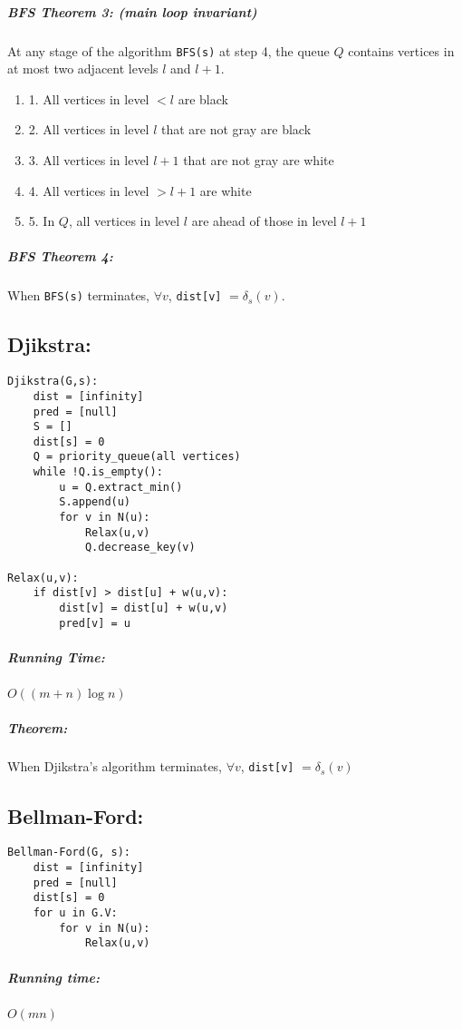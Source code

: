 \documentclass{article}
\newcommand{\code}[1]{\texttt{#1}}
\begin{document}
\subparagraph{BFS Theorem 3: (main loop invariant)} At any stage of the algorithm \code{BFS(s)} at step 4, the queue \(Q\) contains vertices in at most two adjacent levels \(l\) and \(l+1\). \begin{enumerate}
    \item[] 1. All vertices in level \(< l\) are black
    \item[] 2. All vertices in level \(l\) that are not gray are black
    \item[] 3. All vertices in level \(l+1\) that are not gray are white
    \item[] 4. All vertices in level \(> l+1\) are white
    \item[] 5. In \(Q\), all vertices in level \(l\) are ahead of those in level \(l+1\)
\end{enumerate}

\subparagraph{BFS Theorem 4:} When \code{BFS(s)} terminates, \(\forall v\), \code{dist[v]} \(= \delta_s(v)\).

\subsection{Djikstra:}
\begin{lstlisting}
Djikstra(G,s):
    dist = [infinity]
    pred = [null]
    S = []
    dist[s] = 0
    Q = priority_queue(all vertices)
    while !Q.is_empty():
        u = Q.extract_min()
        S.append(u)
        for v in N(u):
            Relax(u,v)
            Q.decrease_key(v)
        
Relax(u,v):
    if dist[v] > dist[u] + w(u,v):
        dist[v] = dist[u] + w(u,v)
        pred[v] = u
\end{lstlisting}

\subparagraph{Running Time:} \(O((m + n) \log n)\)

\subparagraph{Theorem:} When Djikstra's algorithm terminates, \(\forall v\), \code{dist[v]} \(= \delta_s(v)\)

\subsection{Bellman-Ford:}

\begin{lstlisting}
Bellman-Ford(G, s):
    dist = [infinity]
    pred = [null]
    dist[s] = 0
    for u in G.V:
        for v in N(u):
            Relax(u,v)
\end{lstlisting}

\subparagraph{Running time:} \(O(mn)\)
\end{document}
